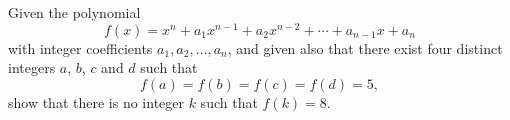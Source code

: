 Given the polynomial \[ f(x)=x^n+a_{1}x^{n-1}+a_{2}x^{n-2}+\cdots+a_{n-1}x+a_n \] with integer coefficients $a_1,a_2,\ldots,a_n$,  and given also that there exist four distinct integers $a$,  $b$,  $c$ and $d$ such that \[ f(a)=f(b)=f(c)=f(d)=5, \] show that there is no integer $k$ such that $f(k)=8$.